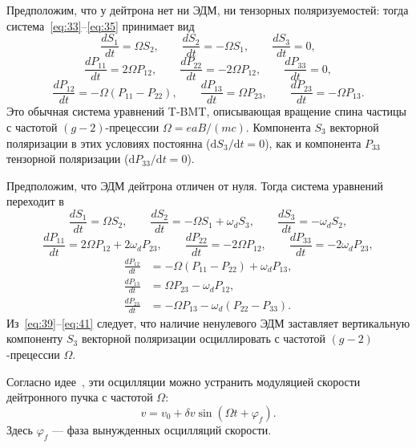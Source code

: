 \documentclass[11pt,a4paper]{article}
\begin{document}
Предположим, что у дейтрона нет ни ЭДМ, ни тензорных поляризуемостей:
тогда система~\eqref{eq:33}--\eqref{eq:35} принимает вид
\begin{equation}
\frac{dS_1}{dt}=\Omega S_2,\qquad
\frac{dS_2}{dt}=-\Omega S_1,\qquad
\frac{dS_3}{dt}=0,
\label{eq:36}
\end{equation}
\begin{equation}
\frac{dP_{11}}{dt}=2\Omega P_{12},\qquad
\frac{dP_{22}}{dt}=-2\Omega P_{12},\qquad
\frac{dP_{33}}{dt}=0,
\label{eq:37}
\end{equation}
\begin{equation}
\frac{dP_{12}}{dt}=-\Omega(P_{11}-P_{22}),\qquad
\frac{dP_{13}}{dt}=\Omega P_{23},\qquad
\frac{dP_{23}}{dt}=-\Omega P_{13}.
\label{eq:38}
\end{equation}
Это обычная система уравнений T-BMT, описывающая вращение спина частицы
с частотой $(g-2)$-прецессии $\Omega=eaB/(mc)$. Компонента $S_3$ векторной
поляризации в этих условиях постоянна ($\mathrm{d}S_3/\mathrm{d}t=0$),
как и компонента $P_{33}$ тензорной поляризации
($\mathrm{d}P_{33}/\mathrm{d}t=0$).

Предположим, что ЭДМ дейтрона отличен от нуля. Тогда система уравнений
переходит в
\begin{equation}
\frac{dS_1}{dt}=\Omega S_2,\qquad
\frac{dS_2}{dt}=-\Omega S_1+\omega_d S_3,\qquad
\frac{dS_3}{dt}=-\omega_d S_2,
\label{eq:39}
\end{equation}
\begin{equation}
\frac{dP_{11}}{dt}=2\Omega P_{12}+2\omega_d P_{23},\qquad
\frac{dP_{22}}{dt}=-2\Omega P_{12},\qquad
\frac{dP_{33}}{dt}=-2\omega_d P_{23},
\label{eq:40}
\end{equation}
\begin{equation}
\begin{aligned}
\frac{dP_{12}}{dt}&=-\Omega(P_{11}-P_{22})+\omega_d P_{13},\\
\frac{dP_{13}}{dt}&=\Omega P_{23}-\omega_d P_{12},\\
\frac{dP_{23}}{dt}&=-\Omega P_{13}-\omega_d(P_{22}-P_{33}).
\end{aligned}
\label{eq:41}
\end{equation}
Из~\eqref{eq:39}--\eqref{eq:41} следует, что наличие ненулевого ЭДМ
заставляет вертикальную компоненту $S_3$ векторной поляризации осциллировать
с частотой $(g-2)$-прецессии $\Omega$.

Согласно идее~\cite{Orlov05}, эти осцилляции можно устранить модуляцией
скорости дейтронного пучка с частотой $\Omega$:
\begin{equation}
v=v_0+\delta v\sin(\Omega t+\varphi_f).
\label{eq:42}
\end{equation}
Здесь $\varphi_f$ --- фаза вынужденных осцилляций скорости.
\end{document}
